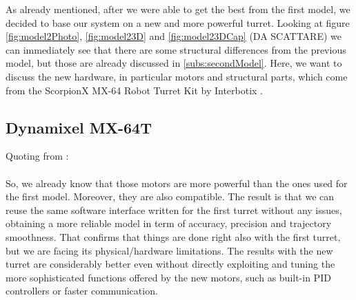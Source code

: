 As already mentioned, after we were able to get the best from the first model, we decided to base our system on a new and more powerful turret. Looking at figure \ref{fig:model2Photo}, \ref{fig:model23D} and \ref{fig:model23DCap} (DA SCATTARE) we can immediately see that there are some structural differences from the previous model, but those are already discussed in \ref{subs:secondModel}. Here, we want to discuss the new hardware, in particular motors and structural parts, which come from the ScorpionX MX-64 Robot Turret Kit by Interbotix \cite{MX64Turret}.
\subsection{Dynamixel MX-64T}
Quoting from \cite{web-MX64}:\\
\\
So, we already know that those motors are more powerful than the ones used for the first model. Moreover, they are also compatible. The result is that we can reuse the same software interface written for the first turret without any issues, obtaining a more reliable model in term of accuracy, precision and trajectory smoothness. That confirms that things are done right also with the first turret, but we are facing its physical/hardware limitations. The results with the new turret are considerably better even without directly exploiting and tuning the more sophisticated functions offered by the new motors, such as built-in PID controllers or faster communication.
